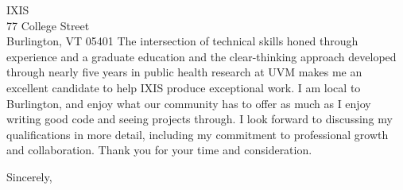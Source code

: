 \documentclass[]{letter}
\begin{document}
\begin{letter}{IXIS \\ 77 College Street \\ Burlington, VT 05401}
The intersection of technical skills honed through experience and a graduate education and the clear-thinking approach developed through nearly five years in public health research at UVM makes me an excellent candidate to help IXIS produce exceptional work. I am local to Burlington, and enjoy what our community has to offer as much as I enjoy writing good code and seeing projects through. I look forward to discussing my qualifications in more detail, including my commitment to professional growth and collaboration. Thank you for your time and consideration.


\signature{Anthony J. Barrows}

\closing{Sincerely,}


\end{letter}
\end{document}
